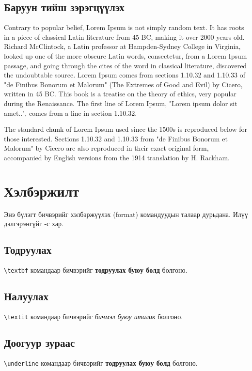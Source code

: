 \documentclass[12pt,A4]{report}
\begin{document}
\subsection{Баруун тийш зэрэгцүүлэх}
\begin{flushright}
Contrary to popular belief, Lorem Ipsum is not simply random text. It has roots in a piece of classical Latin literature from 45 BC, making it over 2000 years old. Richard McClintock, a Latin professor at Hampden-Sydney College in Virginia, looked up one of the more obscure Latin words, consectetur, from a Lorem Ipsum passage, and going through the cites of the word in classical literature, discovered the undoubtable source. Lorem Ipsum comes from sections 1.10.32 and 1.10.33 of "de Finibus Bonorum et Malorum" (The Extremes of Good and Evil) by Cicero, written in 45 BC. This book is a treatise on the theory of ethics, very popular during the Renaissance. The first line of Lorem Ipsum, "Lorem ipsum dolor sit amet..", comes from a line in section 1.10.32.

The standard chunk of Lorem Ipsum used since the 1500s is reproduced below for those interested. Sections 1.10.32 and 1.10.33 from "de Finibus Bonorum et Malorum" by Cicero are also reproduced in their exact original form, accompanied by English versions from the 1914 translation by H. Rackham.
\end{flushright}


\section{Хэлбэржилт}
Энэ бүлэгт бичвэрийг хэлбэржүүлэх (format) командуудын талаар дурьдана. Илүү дэлгэрэнгүйг \cite{format1}-с хар.

\subsection{Тодруулах}
\texttt{\textbackslash textbf} командаар бичвэрийг \textbf{тодруулах буюу болд} болгоно.

\subsection{Налуулах}
\texttt{\textbackslash textit} командаар бичвэрийг \textit{бичмэл буюу италик} болгоно.

\subsection{Доогуур зураас}
\texttt{\textbackslash underline} командаар бичвэрийг \textbf{тодруулах буюу болд} болгоно.
\end{document}
